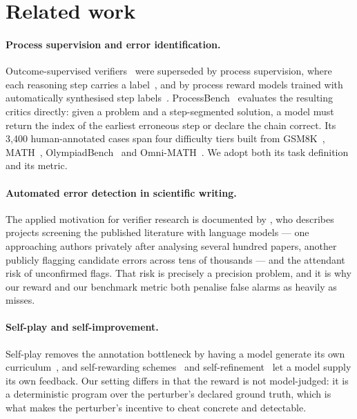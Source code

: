 \documentclass{article} %
\begin{document}
\section{Related work}

\paragraph{Process supervision and error identification.}
Outcome-supervised verifiers~\citep{cobbe2021training} were superseded by process
supervision, where each reasoning step carries a label~\citep{lightman2023verify}, and by
process reward models trained with automatically synthesised step
labels~\citep{wang2024mathshepherd}. ProcessBench~\citep{zheng2024processbench} evaluates
the resulting critics directly: given a problem and a step-segmented solution, a model must
return the index of the earliest erroneous step or declare the chain correct. Its 3,400
human-annotated cases span four difficulty tiers built from
GSM8K~\citep{cobbe2021training}, MATH~\citep{hendrycks2021measuring},
OlympiadBench~\citep{he2024olympiadbench} and Omni-MATH~\citep{gao2024omnimath}. We adopt
both its task definition and its metric.

\paragraph{Automated error detection in scientific writing.}
The applied motivation for verifier research is documented by \citet{gibney2025errors},
who describes projects screening the published literature with language models --- one
approaching authors privately after analysing several hundred papers, another publicly
flagging candidate errors across tens of thousands --- and the attendant risk of unconfirmed
flags. That risk is precisely a precision problem, and it is why our reward and our
benchmark metric both penalise false alarms as heavily as misses.

\paragraph{Self-play and self-improvement.}
Self-play removes the annotation bottleneck by having a model generate its own
curriculum~\citep{silver2017mastering,chen2024selfplay}, and self-rewarding
schemes~\citep{yuan2024selfrewarding} and self-refinement~\citep{madaan2023selfrefine} let a
model supply its own feedback. Our setting differs in that the reward is not model-judged:
it is a deterministic program over the perturber's declared ground truth, which is what
makes the perturber's incentive to cheat concrete and detectable.
\end{document}

